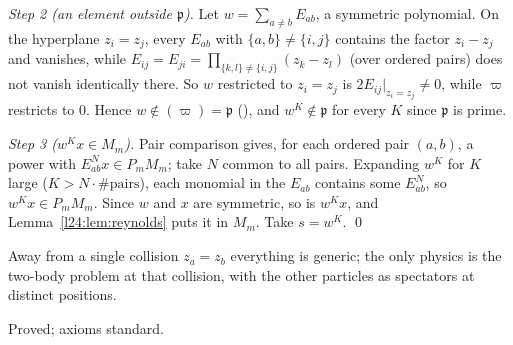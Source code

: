 \emph{Step 2 (an element outside $\mathfrak p$).} Let $w=\sum_{a\neq b}E_{ab}$, a symmetric polynomial. On the hyperplane
$z_i=z_j$, every $E_{ab}$ with $\{a,b\}\neq\{i,j\}$ contains the factor $z_i-z_j$ and vanishes, while
$E_{ij}=E_{ji}=\prod_{\{k,l\}\neq\{i,j\}}(z_k-z_l)$ (over ordered pairs) does not vanish identically there. So $w$ restricted to
$z_i=z_j$ is $2E_{ij}|_{z_i=z_j}\neq0$, while $\varpi$ restricts to $0$. Hence $w\notin(\varpi)=\mathfrak p$ (),
and $w^K\notin\mathfrak p$ for every $K$ since $\mathfrak p$ is prime.

\emph{Step 3 ($w^Kx\in M_m$).} Pair comparison gives, for each ordered pair $(a,b)$, a power with $E_{ab}^Nx\in P_mM_m$; take
$N$ common to all pairs. Expanding $w^K$ for $K$ large ($K>N\cdot\#\text{pairs}$), each monomial in the $E_{ab}$ contains some
$E_{ab}^N$, so $w^Kx\in P_mM_m$. Since $w$ and $x$ are symmetric, so is $w^Kx$, and Lemma~\ref{l24:lem:reynolds} puts it
in $M_m$. Take $s=w^K$. \qed

\begin{physics}
Away from a single collision $z_a=z_b$ everything is generic; the only physics is the two-body problem at that
collision, with the other particles as spectators at distinct positions.
\end{physics}

\begin{status}
Proved; axioms standard.
\end{status}

